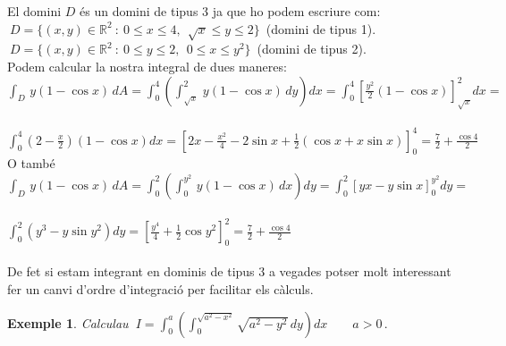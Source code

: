 \documentclass[12pt]{article}
\newtheorem{exemple}{Exemple}[subsection]
\newcommand{\R}{\mathbb{R}}
\begin{document}


El domini $D$ {\'e}s un domini de tipus 3 ja que ho podem escriure com:\\

$\ D=\{(x,y)\in\R^2\ :\ 0\leq x\leq 4,\ \ \sqrt{x}\leq y\leq 2\}\,$
(domini de tipus 1).\\

$\ D=\{(x,y)\in\R^2\ :\ 0\leq y\leq 2,\ \ 0\leq x\leq y^2\}\,$
(domini de tipus 2).\\

Podem calcular la nostra integral de dues maneres:\\

\hspace*{1cm}$\displaystyle\int_D\,y(1-\cos x)\,dA=
\int_0^{4}\left(\int_{\sqrt{x}}^{2}\,y(1-\cos x)\,
dy\right)dx=\int_0^{4}\left[\frac{y^2}{2} (1- \cos x)\right]_{\sqrt{x}}^{2}dx=$\\\\


\hspace*{1cm}$\displaystyle\int_0^{4}\left(2-\frac{x}{2}\right)\left(1-\cos
x\right)dx=\left[2x-\frac{x^2}{4}-2\sin
x+\frac{1}{2}(\cos x+x\sin x)\right]_0^{4}=\frac{7}{2}+\frac{\cos 4}{2}$\\

O tamb{\'e}\\

\hspace*{1cm}$\displaystyle\int_D\,y(1-\cos x)\,dA=
\int_0^{2}\left(\int_{0}^{y^2}\,y(1-\cos x)\,
dx\right)dy=\int_0^{2}[yx -y\sin x]_0^{y^2}dy=$\\\\


\hspace*{1cm}$\displaystyle\int_0^{2}(y^3-y \sin
y^2)dy=\left[\frac{y^4}{4}+\frac{1}{2}\cos
y^2\right]_0^{2}=\frac{7}{2}+\frac{\cos 4}{2}$\\\\

De fet si estam integrant en dominis de tipus 3 a vegades potser
molt interessant fer un canvi d'ordre d'integraci{\'o} per facilitar els
c{\`a}lculs.\\

\begin{exemple}
Calculau $\ \displaystyle
I=\int_0^a\left(\int_0^{\sqrt{a^2-x^2}}\sqrt{a^2-y^2}\,dy\right)dx\qquad
a>0\,.$
\end{exemple}
\end{document}
